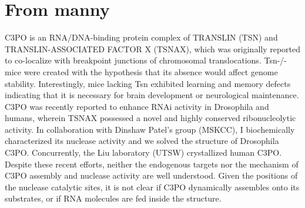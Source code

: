 \documentclass[12pt]{rockefeller}
\begin{document}
\section{From manny}
C3PO is an RNA/DNA-binding protein complex of TRANSLIN (TSN) and TRANSLIN-ASSOCIATED FACTOR X (TSNAX), which was originally reported to co-localize with breakpoint junctions of chromosomal translocations. Tsn-/- mice were created with the hypothesis that its absence would affect genome stability. Interestingly, mice lacking Tsn exhibited learning and memory defects indicating that it is necessary for brain development or neurological maintenance. C3PO was recently reported to enhance RNAi activity in Drosophila and humans, wherein TSNAX possessed a novel and highly conserved ribonucleolytic activity. In collaboration with Dinshaw Patel’s group (MSKCC), I biochemically characterized its nuclease activity and we solved the structure of Drosophila C3PO. Concurrently, the Liu laboratory (UTSW) crystallized human C3PO. Despite these recent efforts, neither the endogenous targets nor the mechanism of C3PO assembly and nuclease activity are well understood. Given the positions of the nuclease catalytic sites, it is not clear if C3PO dynamically assembles onto its substrates, or if RNA molecules are fed inside the structure.
\end{document}
